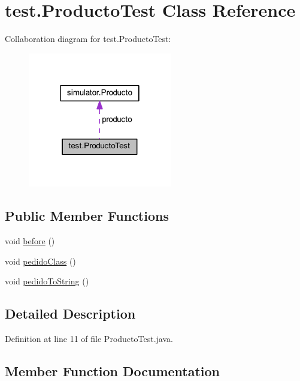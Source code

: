 \hypertarget{classtest_1_1_producto_test}{}\section{test.\+Producto\+Test Class Reference}
\label{classtest_1_1_producto_test}


Collaboration diagram for test.\+Producto\+Test\+:\nopagebreak
\begin{figure}[H]
\begin{center}
\leavevmode
\includegraphics[width=178pt]{classtest_1_1_producto_test__coll__graph}
\end{center}
\end{figure}
\subsection*{Public Member Functions}
\begin{DoxyCompactItemize}
\item 
void \mbox{\hyperlink{classtest_1_1_producto_test_a0ac3e1c91ba64720856242e5aa9fb78b}{before}} ()
\item 
void \mbox{\hyperlink{classtest_1_1_producto_test_ae7f0a17e46f738f4d5bdd4115ffdbff1}{pedido\+Class}} ()
\item 
void \mbox{\hyperlink{classtest_1_1_producto_test_aa7c9f6941160c893d9833c67bf37884b}{pedido\+To\+String}} ()
\end{DoxyCompactItemize}


\subsection{Detailed Description}


Definition at line 11 of file Producto\+Test.\+java.



\subsection{Member Function Documentation}
\mbox{\label{classtest_1_1_producto_test_a0ac3e1c91ba64720856242e5aa9fb78b}} 

